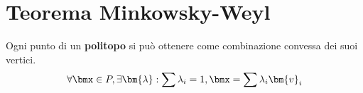 \documentclass[\main/main.tex]{subfiles}
\begin{document}
\section{Teorema Minkowsky-Weyl}

\begin{theorem} \label{minkowsky}
  Ogni punto di un \textbf{politopo} si può ottenere come combinazione convessa dei suoi vertici.
  \[
    \forall \bmx \in P, \exists \bm{\lambda}: \sum \lambda_i = 1, \bmx = \sum \lambda_i \bm{v}_i
  \]
\end{theorem}
\end{document}
